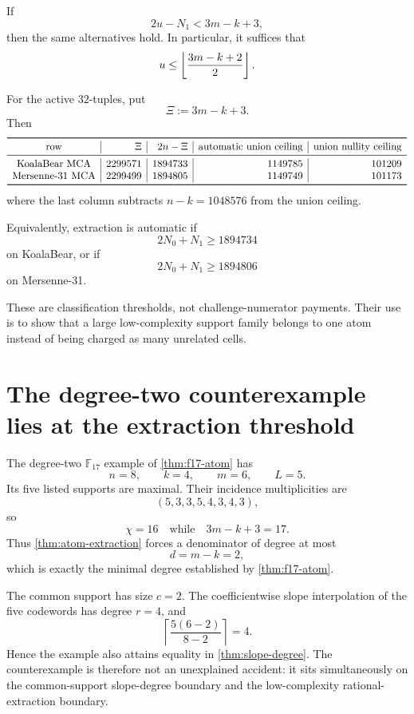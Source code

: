 \documentclass[11pt,a4paper]{amsart}
\numberwithin{equation}{section}
\theoremstyle{remark}
\newcommand{\F}{\mathbb F}\newcommand{\B}{\mathbb B}\newcommand{\K}{\mathbb K}\newcommand{\Z}{\mathbb Z}
\newcommand{\ceil}[1]{\left\lceil #1\right\rceil}\newcommand{\defeq}{\coloneqq}
\begin{document}
\begin{corollary}\label{cor:union-form}
If
\[
 2u-N_1<3m-k+3,
\]
then the same alternatives hold.  In particular, it suffices that
\[
 u\le\left\lfloor \frac{3m-k+2}{2}\right\rfloor.
\]
\end{corollary}

\begin{corollary}\label{cor:active-extraction}
For the active $32$-tuples, put
\[
 \Xi:=3m-k+3.
\]
Then
\[
\begin{array}{c|r|r|r|r}
\toprule
\text{row}&\Xi&2n-\Xi&\text{automatic union ceiling}&\text{union nullity ceiling}\\
\midrule
\text{KoalaBear MCA}&2299571&1894733&1149785&101209\\
\text{Mersenne-31 MCA}&2299499&1894805&1149749&101173\\
\bottomrule
\end{array}
\]
where the last column subtracts $n-k=1048576$ from the union ceiling.

Equivalently, extraction is automatic if
\[
 2N_0+N_1\ge1894734
\]
on KoalaBear, or if
\[
 2N_0+N_1\ge1894806
\]
on Mersenne-31.
\end{corollary}

These are classification thresholds, not challenge-numerator payments.  Their use is to show that a large low-complexity support family belongs to one atom instead of being charged as many unrelated cells.

\section{The degree-two counterexample lies at the extraction threshold}

The degree-two $\F_{17}$ example of \cref{thm:f17-atom} has
\[
 n=8,
 \qquad k=4,
 \qquad m=6,
 \qquad L=5.
\]
Its five listed supports are maximal.  Their incidence multiplicities are
\[
 (5,3,3,5,4,3,4,3),
\]
so
\[
 \chi=16
 \quad\text{while}\quad
 3m-k+3=17.
\]
Thus \cref{thm:atom-extraction} forces a denominator of degree at most
\[
 d=m-k=2,
\]
which is exactly the minimal degree established by \cref{thm:f17-atom}.

The common support has size $c=2$.  The coefficientwise slope interpolation of the five codewords has degree $r=4$, and
\[
 \ceil{\frac{5(6-2)}{8-2}}=4.
\]
Hence the example also attains equality in \cref{thm:slope-degree}.  The counterexample is therefore not an unexplained accident: it sits simultaneously on the common-support slope-degree boundary and the low-complexity rational-extraction boundary.
\end{document}
